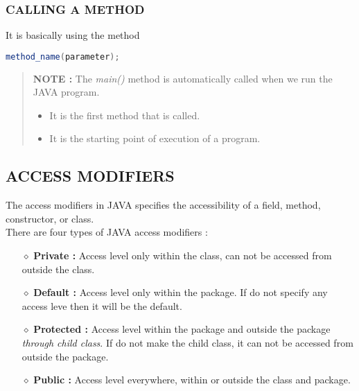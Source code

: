 \subsubsection{CALLING A METHOD}
It is basically using the method
\begin{lstlisting}[language=java]
	method_name(parameter);
\end{lstlisting}

\begin{quotation}
	\textbf{NOTE :} The \textsl{main()} method is automatically called when we run the JAVA program.
	\begin{itemize}
		\item It is the first method that is called.
		\item It is the starting point of execution of a program.
	\end{itemize}
\end{quotation}

\subsection{ACCESS MODIFIERS}
The access modifiers in JAVA specifies the accessibility of a field, method, constructor, or class.\\
There are four types of JAVA access modifiers :
\begin{itemize}
	\item[{\LARGE $\diamond$}] \textbf{Private :} Access level only within the class, can not be accessed from outside the class.
	
	\item[{\LARGE $\diamond$}] \textbf{Default :} Access level only within the package. If do not specify any access leve then it will be the default.
	
	\item[{\LARGE $\diamond$}] \textbf{Protected :} Access level within the package and outside the package \textsl{through child class}. If do not make the child class, it can not be accessed from outside the package.
	
	\item[{\LARGE $\diamond$}] \textbf{Public :} Access level everywhere, within or outside the class and package.
\end{itemize}


